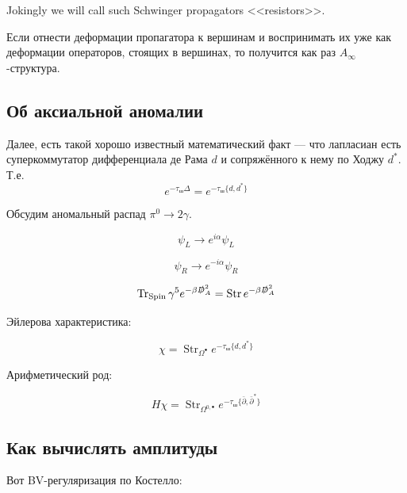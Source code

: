 \documentclass[11pt]{article}
\def\p{\partial}
\theoremstyle{remark}
\theoremstyle{definition}
\begin{document}
Jokingly we will call such Schwinger propagators <<resistors>>.

Если отнести деформации пропагатора к вершинам и воспринимать их уже как деформации операторов, стоящих в вершинах, то получится как раз $A_{\infty}$-структура.


\subsection{Об аксиальной аномалии}


Далее, есть такой хорошо известный математический факт --- что лапласиан есть суперкоммутатор дифференциала де Рама $d$ и сопряжённого к нему по Ходжу $d^*$. Т.е. $$e^{-\tau_{\text{ш}} \Delta} = e^{-\tau_{\text{ш}} \{ d, d^* \} }$$

Обсудим аномальный распад $\pi^0 \to 2\gamma$.

$$\psi_L \to e^{i\alpha} \psi_L $$

$$\psi_R \to e^{-i\alpha} \psi_R $$

$$\operatorname{Tr}_{\text{Spin}} \gamma^5 e^{-\beta \slashed{D}^2_A} = \operatorname{Str} e^{-\beta \slashed{D}^2_A}$$

Эйлерова характеристика:

$$\chi = \operatorname{Str}_{\Omega^{\bullet}} e^{-\tau_{\text{ш}} \{ d, d^* \}  } $$

Арифметический род:

$$H\chi = \operatorname{Str}_{\Omega^{0,\bullet}} e^{-\tau_{\text{ш}} \{ \bar \p, \bar \p^* \}  } $$

\subsection{Как вычислять амплитуды}

Вот BV-регуляризация по Костелло:

\begin{center}
\end{center}
\end{document}
